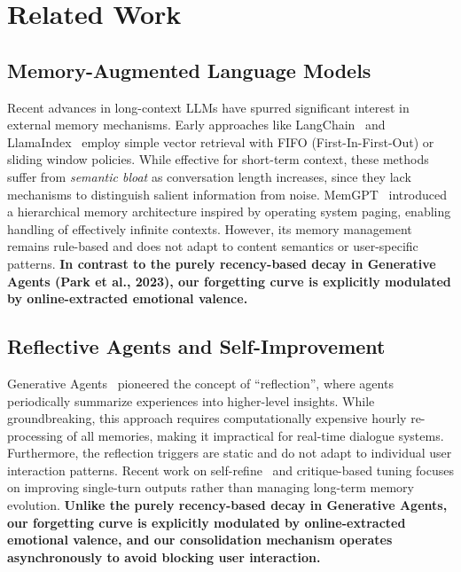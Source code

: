 \section{Related Work}
\label{sec:related_work}

\subsection{Memory-Augmented Language Models}
Recent advances in long-context LLMs have spurred significant interest in external memory mechanisms. Early approaches like LangChain~\cite{langchain} and LlamaIndex~\cite{llamaindex} employ simple vector retrieval with FIFO (First-In-First-Out) or sliding window policies. While effective for short-term context, these methods suffer from \textit{semantic bloat} as conversation length increases, since they lack mechanisms to distinguish salient information from noise. MemGPT~\cite{memgpt} introduced a hierarchical memory architecture inspired by operating system paging, enabling handling of effectively infinite contexts. However, its memory management remains rule-based and does not adapt to content semantics or user-specific patterns. \textbf{In contrast to the purely recency-based decay in Generative Agents (Park et al., 2023), our forgetting curve is explicitly modulated by online-extracted emotional valence.}

\subsection{Reflective Agents and Self-Improvement}
Generative Agents~\cite{generative_agents} pioneered the concept of ``reflection'', where agents periodically summarize experiences into higher-level insights. While groundbreaking, this approach requires computationally expensive hourly re-processing of all memories, making it impractical for real-time dialogue systems. Furthermore, the reflection triggers are static and do not adapt to individual user interaction patterns. Recent work on self-refine~\cite{selfrefine} and critique-based tuning focuses on improving single-turn outputs rather than managing long-term memory evolution. \textbf{Unlike the purely recency-based decay in Generative Agents, our forgetting curve is explicitly modulated by online-extracted emotional valence, and our consolidation mechanism operates asynchronously to avoid blocking user interaction.}

